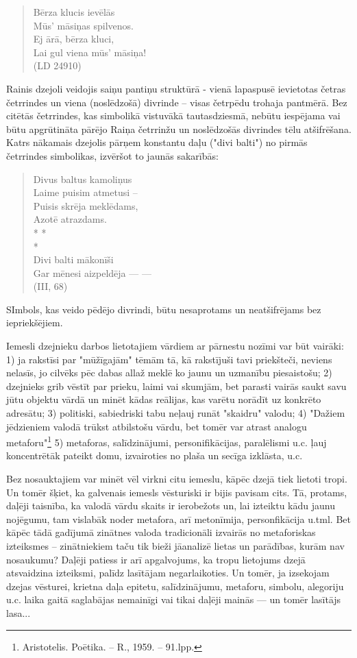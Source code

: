 \documentclass[11pt]{article}
\begin{document}
\begin{quote}
Bērza klucis ievēlās\\
Mūs' māsiņas spilvenos.\\
Ej ārā, bērza kluci,\\
Lai gul viena mūs' māsiņa!\\
(LD 24910)
\end{quote}

Rainis dzejoli veidojis saiņu pantiņu struktūrā -
vienā lapaspusē ievietotas četras četrrindes un viena
(noslēdzošā) divrinde -- visas četrpēdu trohaja
pantmērā. Bez citētās četrrindes, kas simbolikā
vistuvākā tautasdziesmā, nebūtu iespējama vai būtu
apgrūtināta pārējo Raiņa četrrinžu un noslēdzošās
divrindes tēlu atšifrēšana. Katrs nākamais dzejolis pārņem
konstantu daļu ("divi balti") no pirmās četrrindes
simbolikas, izvēršot to jaunās sakarībās:

\begin{quote}
Divus baltus kamoliņus\\
Laime puisim atmetusi -- \\
Puisis skrēja meklēdams,\\
Azotē atrazdams.\\
* *\\
*\\
Divi balti mākonīši\\
Gar mēnesi aizpeldēja --- ---\\
(III, 68)
\end{quote}

SImbols, kas veido pēdējo divrindi, būtu nesaprotams un
neatšifrējams bez iepriekšējiem.

Iemesli dzejnieku darbos lietotajiem vārdiem ar pārnestu
nozīmi var būt vairāki: 1) ja rakstīsi par "mūžīgajām"
tēmām tā, kā rakstījuši tavi priekšteči, neviens nelasīs,
jo cilvēks pēc dabas allaž meklē ko jaunu un uzmanību
piesaistošu; 2) dzejnieks grib vēstīt par
prieku, laimi vai skumjām, bet parasti vairās saukt
savu jūtu objektu vārdā un minēt kādas reālijas, kas
varētu norādīt uz konkrēto adresātu;
3) politiski, sabiedriski tabu neļauj runāt "skaidru"
valodu; 4) "Dažiem jēdzieniem valodā trūkst atbilstošu
vārdu, bet tomēr var atrast analogu
metaforu"\footnote{Aristotelis. Poētika. -- R., 1959. -- 91.lpp.}
{\color{red}
5) metaforas, salīdzinājumi, personifikācijas,
paralēlismi u.c. ļauj koncentrētāk pateikt domu, izvairoties
no plaša un secīga izklāsta, u.c.
}

Bez nosauktajiem var minēt vēl virkni citu iemeslu,
kāpēc dzejā tiek lietoti tropi. Un tomēr šķiet, ka
galvenais iemesls vēsturiski ir bijis pavisam cits.
Tā, protams, daļēji taisnība, ka valodā vārdu skaits ir
ierobežots un, lai izteiktu kādu jaunu nojēgumu,
tam vislabāk noder metafora, arī metonīmija,
personfikācija u.tml. Bet kāpēc tādā gadījumā
zinātnes valoda tradicionāli izvairās no metaforiskas
izteiksmes -- zinātniekiem taču tik bieži jāanalizē lietas
un parādības, kurām nav nosaukumu?
Daļēji patiess ir arī apgalvojums, ka tropu lietojums
dzejā atsvaidzina izteiksmi, palīdz lasītājam negarlaikoties.
Un tomēr, ja izsekojam dzejas vēsturei, krietna daļa
epitetu, salīdzinājumu, metaforu, simbolu, alegoriju
u.c. laika gaitā saglabājas nemainīgi vai tikai daļēji
mainās --- un tomēr lasītājs lasa...
\end{document}
